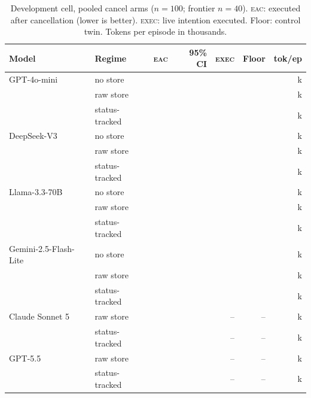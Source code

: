 \documentclass{article}
\newcommand{\eac}{\textsc{eac}}
\newcommand{\execm}{\textsc{exec}}
\begin{document}
\begin{table}[t]
\centering\small
\caption{Development cell, pooled cancel arms ($n{=}100$; frontier $n{=}40$).
\eac{}: executed after cancellation (lower is better). \execm{}: live intention
executed. Floor: control twin. Tokens per episode in thousands.}
\label{tab:main}
\begin{tabular}{llrrrrr}
\toprule
Model & Regime & \eac{} & 95\% CI & \execm{} & Floor & tok/ep \\
\midrule
GPT-4o-mini & no store & \eacMiniNone{} & \eacCIMiniNone{} & \execMiniNone{} & \ctrlMiniNone{} & \tokMiniNone{}k \\
 & raw store & \eacMiniBank{} & \eacCIMiniBank{} & \execMiniBank{} & \ctrlMiniBank{} & \tokMiniBank{}k \\
 & status-tracked & \eacMiniSchedtwo{} & \eacCIMiniSchedtwo{} & \execMiniSchedtwo{} & \ctrlMiniSchedtwo{} & \tokMiniSchedtwo{}k \\
\midrule
DeepSeek-V3 & no store & \eacDeepseekNone{} & \eacCIDeepseekNone{} & \execDeepseekNone{} & \ctrlDeepseekNone{} & \tokDeepseekNone{}k \\
 & raw store & \eacDeepseekBank{} & \eacCIDeepseekBank{} & \execDeepseekBank{} & \ctrlDeepseekBank{} & \tokDeepseekBank{}k \\
 & status-tracked & \eacDeepseekSchedtwo{} & \eacCIDeepseekSchedtwo{} & \execDeepseekSchedtwo{} & \ctrlDeepseekSchedtwo{} & \tokDeepseekSchedtwo{}k \\
\midrule
Llama-3.3-70B & no store & \eacLlamaNone{} & \eacCILlamaNone{} & \execLlamaNone{} & \ctrlLlamaNone{} & \tokLlamaNone{}k \\
 & raw store & \eacLlamaBank{} & \eacCILlamaBank{} & \execLlamaBank{} & \ctrlLlamaBank{} & \tokLlamaBank{}k \\
 & status-tracked & \eacLlamaSchedtwo{} & \eacCILlamaSchedtwo{} & \execLlamaSchedtwo{} & \ctrlLlamaSchedtwo{} & \tokLlamaSchedtwo{}k \\
\midrule
Gemini-2.5-Flash-Lite & no store & \eacGeminiNone{} & \eacCIGeminiNone{} & \execGeminiNone{} & \ctrlGeminiNone{} & \tokGeminiNone{}k \\
 & raw store & \eacGeminiBank{} & \eacCIGeminiBank{} & \execGeminiBank{} & \ctrlGeminiBank{} & \tokGeminiBank{}k \\
 & status-tracked & \eacGeminiSchedtwo{} & \eacCIGeminiSchedtwo{} & \execGeminiSchedtwo{} & \ctrlGeminiSchedtwo{} & \tokGeminiSchedtwo{}k \\
\midrule
Claude Sonnet 5 & raw store & \eacSonnetBank{} & \eacCISonnetBank{} & -- & -- & \tokSonnetBank{}k \\
 & status-tracked & \eacSonnetSchedtwo{} & \eacCISonnetSchedtwo{} & -- & -- & \tokSonnetSchedtwo{}k \\
\midrule
GPT-5.5 & raw store & \eacGptffBank{} & \eacCIGptffBank{} & -- & -- & \tokGptffBank{}k \\
 & status-tracked & \eacGptffSchedtwo{} & \eacCIGptffSchedtwo{} & -- & -- & \tokGptffSchedtwo{}k \\
\bottomrule
\end{tabular}
\end{table}
\end{document}

